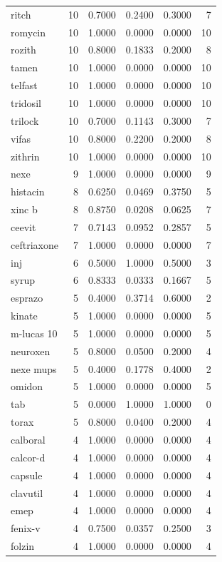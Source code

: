 \begin{longtable}{p{3.0cm}rrrrr}
ritch & 10 & 0.7000 & 0.2400 & 0.3000 & 7 \\
romycin & 10 & 1.0000 & 0.0000 & 0.0000 & 10 \\
rozith & 10 & 0.8000 & 0.1833 & 0.2000 & 8 \\
tamen & 10 & 1.0000 & 0.0000 & 0.0000 & 10 \\
telfast & 10 & 1.0000 & 0.0000 & 0.0000 & 10 \\
tridosil & 10 & 1.0000 & 0.0000 & 0.0000 & 10 \\
trilock & 10 & 0.7000 & 0.1143 & 0.3000 & 7 \\
vifas & 10 & 0.8000 & 0.2200 & 0.2000 & 8 \\
zithrin & 10 & 1.0000 & 0.0000 & 0.0000 & 10 \\
nexe & 9 & 1.0000 & 0.0000 & 0.0000 & 9 \\
histacin & 8 & 0.6250 & 0.0469 & 0.3750 & 5 \\
xinc b & 8 & 0.8750 & 0.0208 & 0.0625 & 7 \\
ceevit & 7 & 0.7143 & 0.0952 & 0.2857 & 5 \\
ceftriaxone & 7 & 1.0000 & 0.0000 & 0.0000 & 7 \\
inj & 6 & 0.5000 & 1.0000 & 0.5000 & 3 \\
syrup & 6 & 0.8333 & 0.0333 & 0.1667 & 5 \\
esprazo & 5 & 0.4000 & 0.3714 & 0.6000 & 2 \\
kinate & 5 & 1.0000 & 0.0000 & 0.0000 & 5 \\
m-lucas 10 & 5 & 1.0000 & 0.0000 & 0.0000 & 5 \\
neuroxen & 5 & 0.8000 & 0.0500 & 0.2000 & 4 \\
nexe mups & 5 & 0.4000 & 0.1778 & 0.4000 & 2 \\
omidon & 5 & 1.0000 & 0.0000 & 0.0000 & 5 \\
tab & 5 & 0.0000 & 1.0000 & 1.0000 & 0 \\
torax & 5 & 0.8000 & 0.0400 & 0.2000 & 4 \\
calboral & 4 & 1.0000 & 0.0000 & 0.0000 & 4 \\
calcor-d & 4 & 1.0000 & 0.0000 & 0.0000 & 4 \\
capsule & 4 & 1.0000 & 0.0000 & 0.0000 & 4 \\
clavutil & 4 & 1.0000 & 0.0000 & 0.0000 & 4 \\
emep & 4 & 1.0000 & 0.0000 & 0.0000 & 4 \\
fenix-v & 4 & 0.7500 & 0.0357 & 0.2500 & 3 \\
folzin & 4 & 1.0000 & 0.0000 & 0.0000 & 4 \\

\end{longtable}
